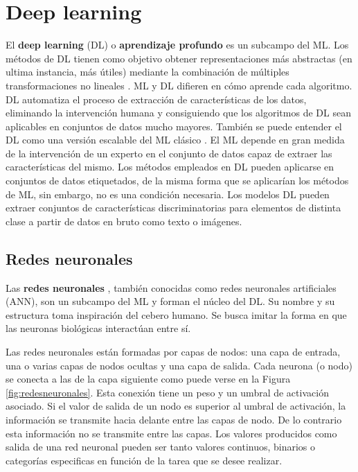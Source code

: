 \section{Deep learning}
El \textbf{deep learning} (DL) o \textbf{aprendizaje profundo} \cite{lecun2015deep,schmidhuber2015deep,goodfellow2016deep} es un subcampo del ML. Los métodos de DL tienen como objetivo obtener representaciones más abstractas (en ultima instancia, más útiles) mediante la combinación de múltiples transformaciones no lineales \cite{bengio2013representation}. ML y DL difieren en cómo aprende cada algoritmo. DL automatiza el proceso de extracción de características de los datos, eliminando la intervención humana y consiguiendo que los algoritmos de DL sean aplicables en conjuntos de datos mucho mayores. También se puede entender el DL como una versión escalable del ML clásico \cite{ibm_cloud_education_2020}. El ML depende en gran medida de la intervención de un experto en el conjunto de datos capaz de extraer las características del mismo. Los métodos empleados en DL pueden aplicarse en conjuntos de datos etiquetados, de la misma forma que se aplicarían los métodos de ML, sin embargo, no es una condición necesaria. Los modelos DL pueden extraer conjuntos de características discriminatorias para elementos de distinta clase a partir de datos en bruto como texto o imágenes.

\subsection{Redes neuronales}
\label{sec:redes_neuronales}

Las \textbf{redes neuronales} \cite{bishop1995neural}, también conocidas como redes neuronales artificiales (ANN), son un subcampo del ML y forman el núcleo del DL. Su nombre y su estructura toma inspiración del cebero humano. Se busca imitar la forma en que las neuronas biológicas interactúan entre sí.

Las redes neuronales están formadas por capas de nodos: una capa de entrada, una o varias capas de nodos ocultas y una capa de salida. Cada neurona (o nodo) se conecta a las de la capa siguiente como puede verse en la Figura \ref{fig:redesneuronales}. Esta conexión tiene un peso y un umbral de activación asociado. Si el valor de salida de un nodo es superior al umbral de activación, la información se transmite hacia delante entre las capas de nodo. De lo contrario esta información no se transmite entre las capas. Los valores producidos como salida de una red neuronal pueden ser tanto valores continuos, binarios o categorías especificas en función de la tarea que se desee realizar.\\

